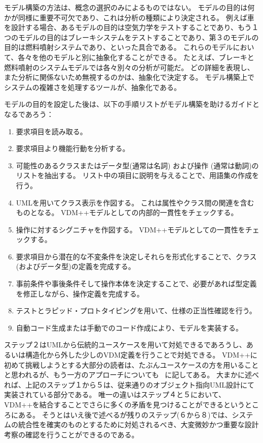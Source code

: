 \documentclass[\pformat,12pt,twoside]{jarticle}
\begin{document}
モデル構築の方法は、概念の選択のみによるものではない。
モデルの目的は何かが同様に重要不可欠であり、これは分析の種類により決定される。
例えば車を設計する場合、あるモデルの目的は空気力学をテストすることであり、もう１つのモデルの目的はブレーキシステムをテストすることであり、第３のモデルの目的は燃料噴射システムであり、といった具合である。
これらのモデルにおいて、各々を他のモデルと別に抽象化することができる。
たとえば、ブレーキと燃料噴射のシステムモデルでは各々別々の分析が可能だ。
どの詳細を表現し、また分析に関係ないため無視するのかは、抽象化で決定する。
モデル構築上でシステムの複雑さを処理するツールが、抽象化である。 

モデルの目的を設定した後は、以下の手順リストがモデル構築を助けるガイドとなるであろう：

\begin{enumerate}
\item 要求項目を読み取る。
\item 要求項目より機能行動を分析する。
\item 可能性のあるクラスまたはデータ型(通常は名詞) および操作 (通常は動詞)のリストを抽出する。
リスト中の項目に説明を与えることで、用語集の作成を行う。
\item UMLを用いてクラス表示を作図する。
これは属性やクラス間の関連を含むものとなる。
VDM++モデルとしての内部的一貫性をチェックする。
\item 
操作に対するシグニチャを作図する。
VDM++モデルとしての一貫性をチェックする。
\item 要求項目から潜在的な不変条件を決定しそれらを形式化することで、クラス (およびデータ型)の定義を完成する。
\item 事前条件や事後条件そして操作本体を決定することで、必要があれば型定義を修正しながら、操作定義を完成する。
\item テストとラピッド・プロトタイピングを用いて、仕様の正当性確認を行う。
\item 自動コード生成または手動でのコード作成により、モデルを実装する。
\end{enumerate}

ステップ２はUMLから伝統的ユースケースを用いて対処できるであろうし、あるいは構造化から外した少しのVDM定義を行うことで対処できる。
VDM++に初めて挑戦しようとする大部分の読者は、たぶんユースケースの方を用いることと思われるが、もう一方のアプローチについても \cite{CashPoint}\ に記してある。
大まかに述べれば、上記のステップ１から５は、従来通りのオブジェクト指向UML設計にて実装されている部分である。
唯一の違いはステップ４と５において、VDM++を結合することでさらに多くの矛盾を見つけることができるというところにある。
そうとはいえ後で述べるが残りのステップ(６から８)では、システムの統合性を確実のものとするために対処されるべき、大変微妙かつ重要な設計考察の確認を行うことができるのである。
\end{document}
